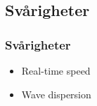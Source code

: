 \subsection{Svårigheter}

\begin{frame}
\frametitle{Svårigheter}

\begin{itemize}[<+(1)->]
\item Real-time speed
\item Wave dispersion
\end{itemize}
\end{frame}